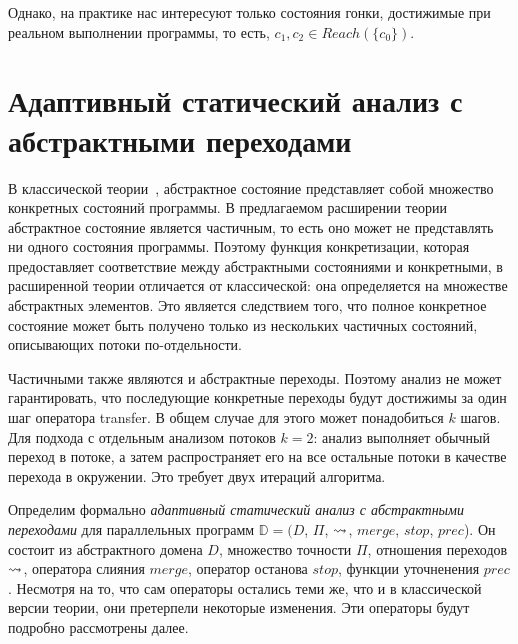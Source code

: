 Однако, на практике нас интересуют только состояния гонки, достижимые при реальном выполнении программы, то есть, $c_1, c_2 \in Reach(\{c_0\})$.



\section{Адаптивный статический анализ с абстрактными переходами}
\label{sect_cpata}

\newcommand{\update}{update}
\newcommand{\frontier}{frontier}

В классической теории~\cite{BeyerCPA07,Beyer08}, абстрактное состояние представляет собой множество конкретных состояний программы.
В предлагаемом расширении теории абстрактное состояние является частичным, то есть оно может не представлять ни одного состояния программы.
Поэтому функция конкретизации, которая предоставляет соответствие между абстрактными состояниями и конкретными, в расширенной теории отличается от классической: она определяется на множестве абстрактных элементов.
Это является следствием того, что полное конкретное состояние может быть получено только из нескольких частичных состояний, описывающих потоки по-отдельности.

Частичными также являются и абстрактные переходы.
Поэтому анализ не может гарантировать, что последующие конкретные переходы будут достижимы за один шаг оператора transfer.
В общем случае для этого может понадобиться $k$ шагов. Для подхода с отдельным анализом потоков $k=2$: анализ выполняет обычный переход в потоке, а затем распространяет его на все остальные потоки в качестве перехода в окружении. Это требует двух итераций алгоритма.

Определим формально \emph{адаптивный статический анализ с абстрактными переходами} для параллельных программ $\mathbb{D}=(D$, $\Pi$, $\leadsto$, $merge$, $stop$, $prec$).
Он состоит из абстрактного домена $D$, 
множество точности $\Pi$, 
отношения переходов $\leadsto$,
оператора слияния $merge$, оператор останова $stop$, функции уточненения $prec$.
Несмотря на то, что сам операторы остались теми же, что и в классической версии теории, они претерпели некоторые изменения.
Эти операторы будут подробно рассмотрены далее.

